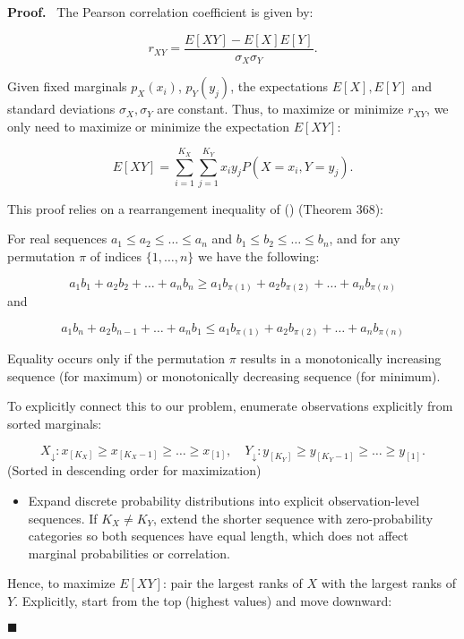 \documentclass[
  12pt,
]{article}
\providecommand{\tightlist}{%
  \setlength{\itemsep}{0pt}\setlength{\parskip}{0pt}}\usepackage{longtable,booktabs,array}
\theoremstyle{plain}
\theoremstyle{definition}
\renewenvironment{proof}
   {\par\noindent\textbf{Proof.}\ }
   {\hfill$\blacksquare$\par}
\theoremstyle{remark}
\begin{document}
\begin{proof}
The Pearson correlation coefficient is given by:

\[r_{XY} = \frac{E[XY] - E[X]E[Y]}{\sigma_X \sigma_Y}.\]

Given fixed marginals \(p_X(x_i)\), \(p_Y(y_j)\), the expectations
\(E[X], E[Y]\) and standard deviations \(\sigma_X, \sigma_Y\) are
constant. Thus, to maximize or minimize \(r_{XY}\), we only need to
maximize or minimize the expectation \(E[XY]\):

\[E[XY] = \sum_{i=1}^{K_X}\sum_{j=1}^{K_Y} x_i y_j P(X = x_i, Y = y_j).\]

This proof relies on a rearrangement inequality of
() (Theorem 368):

For real sequences \(a_1 \leq a_2 \leq \dots \leq a_n\) and
\(b_1 \leq b_2 \leq \dots \leq b_n\), and for any permutation \(\pi\) of
indices \(\{1,\dots,n\}\) we have the following:

\[a_1 b_1 + a_2 b_2 + \dots + a_n b_n \geq a_1 b_{\pi(1)} + a_2 b_{\pi(2)} + \dots + a_n b_{\pi(n)}\]
and

\[a_1 b_n + a_2 b_{n-1} + \dots + a_n b_1 \leq a_1 b_{\pi(1)} + a_2 b_{\pi(2)} + \dots + a_n b_{\pi(n)}\]

Equality occurs only if the permutation \(\pi\) results in a
monotonically increasing sequence (for maximum) or monotonically
decreasing sequence (for minimum).

To explicitly connect this to our problem, enumerate observations
explicitly from sorted marginals:

\[
X_{\downarrow}: x_{[K_X]} \geq x_{[K_X-1]} \geq \dots \geq x_{[1]}, \quad  
        Y_{\downarrow}: y_{[K_Y]} \geq y_{[K_Y-1]} \geq \dots \geq y_{[1]}.
\] (Sorted in descending order for maximization)

\begin{itemize}
\tightlist
\item
  Expand discrete probability distributions into explicit
  observation-level sequences. If \(K_X \neq K_Y\), extend the shorter
  sequence with zero-probability categories so both sequences have equal
  length, which does not affect marginal probabilities or correlation.
\end{itemize}

Hence, to maximize \(E[XY]\): pair the largest ranks of \(X\) with the
largest ranks of \(Y\). Explicitly, start from the top (highest values)
and move downward:


\end{proof}
\end{document}
